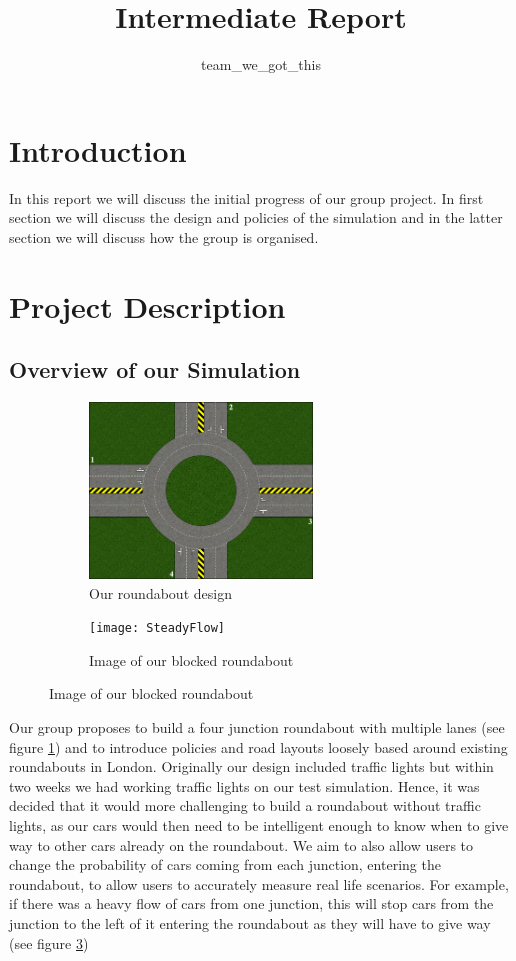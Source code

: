 \documentclass[11pt]{article}
\title{{Intermediate Report}}
\date{}
\author{team\_we\_got\_this}
\begin{document}
	\maketitle
	\thispagestyle{fancy}
	\section{Introduction}
	In this report we will discuss the initial progress of our group project. 
	In first section we will discuss the design and policies of the simulation and in the latter section we will discuss how the group is organised.
	
	
	\section{Project Description}
	
	\subsection{Overview of our Simulation}
	\begin{figure}
		\begin{subfigure}{.45\textwidth}
		\centering
		\includegraphics[width=0.65\textwidth]{Roundabout2}
		\caption{Our roundabout design}
		\label{RoundaboutDesign}
		\end{subfigure}
		\begin{subfigure}{.45\textwidth}
		\centering
		\texttt{[image: SteadyFlow]}
		\caption{Image of our blocked roundabout}
		\label{Steadyflow}
		\end{subfigure}
	\end{figure}
	Our group proposes to build a four junction roundabout with multiple lanes (see figure \ref{RoundaboutDesign}) and to introduce policies and road layouts loosely based around existing roundabouts in London.
	 Originally our design included traffic lights but within two weeks we had working traffic lights on our test simulation.
	  Hence, it was decided that it would more challenging to build a roundabout without traffic lights, as our cars would then need to be intelligent enough to know when to give way to other cars already on the roundabout. 
	  We aim to also allow users to change the probability of cars coming from each junction, entering the roundabout, to allow users to accurately measure real life scenarios.
	   For example, if there was a heavy flow of cars from one junction, this will stop cars from the junction to the left of it entering the roundabout as they will have to give way (see figure \ref{Steadyflow})
	
\end{document}
